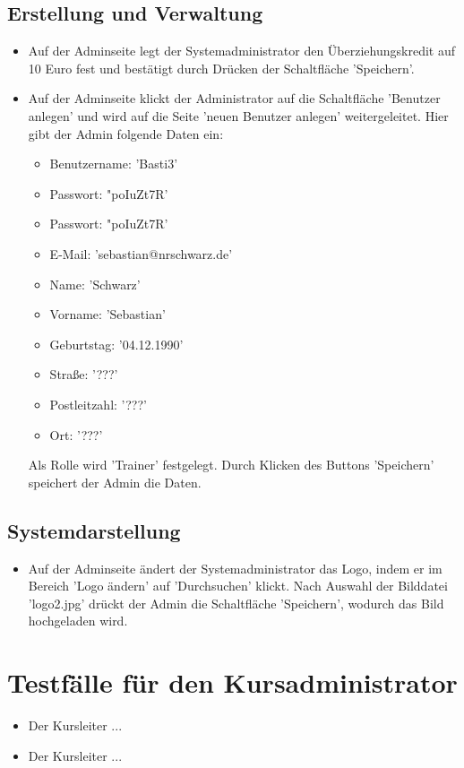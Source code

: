 \documentclass[a4paper]{scrreprt}
\newcounter{Lc}
\newcounter{Hc}
\newcommand{\stepHc}{\stepcounter{Hc}\setcounter{Lc}{0}}
\begin{document}
		\subsection{Erstellung und Verwaltung}
			\begin{itemize}
				\item {} 
				Auf der Adminseite legt der Systemadministrator den Überziehungskredit auf 10 Euro fest und bestätigt durch Drücken der Schaltfläche 'Speichern'.
				
				\item {} 
				Auf der Adminseite klickt der Administrator auf die Schaltfläche 'Benutzer anlegen' und wird auf die Seite 'neuen Benutzer anlegen' weitergeleitet. Hier gibt der Admin folgende Daten ein:
					\begin{itemize}
						\item Benutzername: 'Basti3' 
						\item Passwort: "poIuZt7R'
						\item Passwort: "poIuZt7R'
						\item E-Mail: 'sebastian@nrschwarz.de'
						\item Name: 'Schwarz'
						\item Vorname: 'Sebastian'
						\item Geburtstag: '04.12.1990'
						\item Straße: '???'
						\item Postleitzahl: '???'
						\item Ort: '???'
					\end{itemize}
				Als Rolle wird 'Trainer' festgelegt. Durch Klicken des Buttons 'Speichern' speichert der Admin die Daten.
						
			\end{itemize}						
		\subsection{Systemdarstellung}
			\begin{itemize}
				 \item {} 
				 Auf der Adminseite ändert der Systemadministrator das Logo, indem er im Bereich 'Logo ändern' auf 'Durchsuchen' klickt. Nach Auswahl der Bilddatei 'logo2.jpg' drückt der Admin die Schaltfläche 'Speichern', wodurch das Bild hochgeladen wird.
			\end{itemize}
			
	\section{Testfälle für den Kursadministrator}
		\stepHc
		\begin{itemize}
			\item {} 
			Der Kursleiter ... 		
			\item {} 
			Der Kursleiter ... 		
		\end{itemize}	
		
\end{document}
